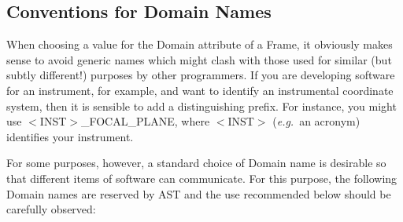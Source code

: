 \documentclass[twoside,11pt]{article}
\begin{document}
\subsection{\label{ss:domainconventions}Conventions for Domain Names}

When choosing a value for the Domain attribute of a Frame, it
obviously makes sense to avoid generic names which might clash with
those used for similar (but subtly different!) purposes by other
programmers. If you are developing software for an instrument, for
example, and want to identify an instrumental coordinate system, then
it is sensible to add a distinguishing prefix. For instance, you might
use $<$INST$>$\_FOCAL\_PLANE, where $<$INST$>$ ({\em{e.g.}}\ an
acronym) identifies your instrument.

For some purposes, however, a standard choice of Domain name is
desirable so that different items of software can communicate. For
this purpose, the following Domain names are reserved by AST and the
use recommended below should be carefully observed:
\end{document}
